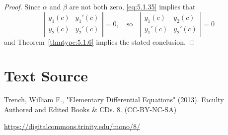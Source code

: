 \documentclass{ximera}
\begin{document}
 
\begin{proof} Since $\alpha$ and $\beta$ are not both zero,   \eqref{eq:5.1.35}
implies that
$$
\left|\begin{array}{ccccccc}
y_{1}(c)&y_{1}'(c)\\y_{2}(c)& y_{2}'(c)
\end{array}\right|=0, \quad\text{so}\quad
\left|\begin{array}{cccccc}
y_{1}(c)&y_{2}(c)\\ y_{1}'(c)&y_{2}'(c)
\end{array}\right|=0
$$
and Theorem~\ref{thmtype:5.1.6} implies the stated conclusion.
\end{proof}
 
\section*{Text Source}
Trench, William F., "Elementary Differential Equations" (2013). Faculty Authored and Edited Books \& CDs. 8. (CC-BY-NC-SA)
 
\href{https://digitalcommons.trinity.edu/mono/8/}{https://digitalcommons.trinity.edu/mono/8/}
 
 
\end{document}
